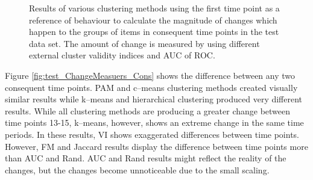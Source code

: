 \begin{figure}[!h]
{\begin{minipage}{\dimexpr \textwidth-2\fboxsep-2\fboxrule}
    \end{minipage}}
    \caption{Results of various clustering methods using the first time point as a reference of behaviour to calculate the magnitude of changes which happen to the groups of items in consequent time points in the test data set. The amount of change  is measured by using different external cluster validity indices and AUC of ROC.}
    \label{fig:test_ChangeMeasuers_Firs}
\end{figure}
             
             
Figure \ref{fig:test_ChangeMeasuers_Cons} shows the difference between any two consequent time points. PAM and c--means clustering methods created visually similar results while k--means and hierarchical clustering produced very different results. While all clustering methods are producing a greater change between time points 13-15,  k--means, however,  shows an extreme change in the same time periods. In these results, VI shows exaggerated differences between time points. However, FM and Jaccard results display the difference between time points more than AUC and Rand. AUC and Rand results might reflect the reality of the changes, but the changes become unnoticeable due to the small scaling.
             
